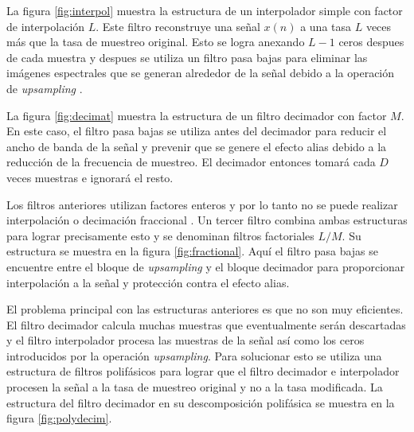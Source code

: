 La figura \ref{fig:interpol} muestra la estructura de un interpolador simple con factor de
interpolaci\'on $L$. Este filtro reconstruye una se\~nal $x(n)$ a una tasa $L$ veces m\'as que la tasa
de muestreo original. Esto se logra anexando $L-1$ ceros despues de cada muestra y despues se
utiliza un filtro pasa bajas para eliminar las im\'agenes espectrales que se generan alrededor de la
se\~nal debido a la operaci\'on de \emph{upsampling} \cite{behrouz}.

La figura \ref{fig:decimat} muestra la estructura de un filtro decimador con factor $M$. En este caso, el
filtro pasa bajas se utiliza antes del decimador para reducir el ancho de banda de la se\~nal y
prevenir que se genere el efecto alias debido a la reducci\'on de la frecuencia de muestreo. El
decimador entonces tomar\'a cada $D$ veces muestras e ignorar\'a el resto.

Los filtros anteriores utilizan factores enteros y por lo tanto no se puede realizar interpolaci\'on
o decimaci\'on fraccional \cite{behrouz}. Un tercer filtro combina ambas estructuras para lograr precisamente esto y
se denominan filtros factoriales $L/M$. Su estructura se muestra en la figura
\ref{fig:fractional}. Aqu\'i el filtro pasa bajas se encuentre entre el bloque de \emph{upsampling} y
el bloque decimador para proporcionar interpolaci\'on a la se\~nal y protecci\'on contra el efecto
alias.

El problema principal con las estructuras anteriores es que no son muy eficientes. El filtro decimador calcula
muchas muestras que eventualmente ser\'an descartadas y el filtro interpolador procesa las muestras de
la se\~nal as\'i como los ceros introducidos por la operaci\'on \emph{upsampling}. Para
solucionar esto se utiliza una estructura de filtros polif\'asicos para lograr que el filtro decimador
e interpolador procesen la se\~nal a la tasa de muestreo original y no a la tasa modificada. La
estructura del filtro decimador en su descomposici\'on polif\'asica se muestra en la figura
\ref{fig:polydecim}.

